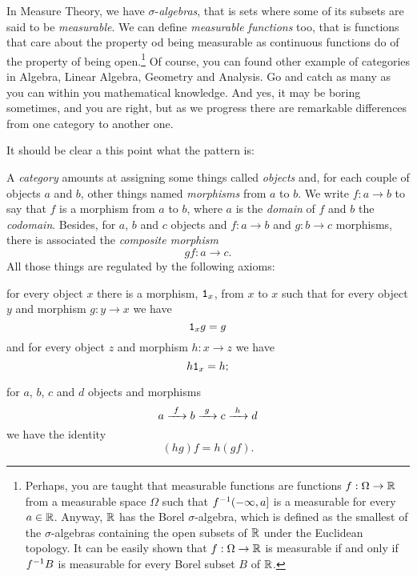 \begin{exercise}
In Measure Theory, we have \(\sigma\)-{\em algebras}, that is sets where some of its subsets are said to be {\em measurable}. We can define {\em measurable functions} too, that is functions that care about the property od being measurable as continuous functions do of the property of being open.\footnote{Perhaps, you are taught that measurable functions are functions \(f : \Omega \to \mathbb R\) from a measurable space \(\Omega\) such that \(f^{-1} (-\infty, a]\) is a measurable for every \(a \in \mathbb R\). Anyway, \(\mathbb R\) has the Borel \(\sigma\)-algebra, which is defined as the smallest of the \(\sigma\)-algebras containing the open subsets of \(\mathbb R\) under the Euclidean topology. It can be easily shown that \(f : \Omega \to \mathbb R\) is measurable if and only if \(f^{-1} B\) is measurable for every Borel subset \(B\) of \(\mathbb R\).} Of course, you can found other example of categories in Algebra, Linear Algebra, Geometry and Analysis. Go and catch as many as you can within you mathematical knowledge. And yes, it may be boring sometimes, and you are right, but as we progress there are remarkable differences from one category to another one.
\end{exercise}

It should be clear a this point what the pattern is:

\begin{definition}[Categories]
A {\em category} amounts at assigning some things called {\em objects} and, for each couple of objects \(a\) and \(b\), other things named {\em morphisms} from \(a\) to \(b\). We write \(f : a \to b\) to say that \(f\) is a morphism from \(a\) to \(b\), where \(a\) is the {\em domain} of \(f\) and \(b\) the {\em codomain}. Besides, for \(a\), \(b\) and \(c\) objects and \(f : a \to b\) and \(g : b \to c\) morphisms, there is associated the {\em composite morphism}
\[gf : a \to c .\]
All those things are regulated by the following axioms:
\begin{tcbenum}
\item for every object \(x\) there is a morphism, \(\mathtt 1_x\), from \(x\) to \(x\) such that for every object \(y\) and morphism \(g : y \to x\) we have
\[\mathtt 1_x g = g\]
and for every object \(z\) and morphism \(h : x \to z\) we have
\[h \mathtt 1_x = h ;\]
\item for \(a\), \(b\), \(c\) and \(d\) objects and morphisms
\[a \xrightarrow{\ f\ } b \xrightarrow{\ g\ } c \xrightarrow{\ h\ } d\]
we have the identity
\[(h g) f = h (g f) .\]
\end{tcbenum}
\end{definition}

